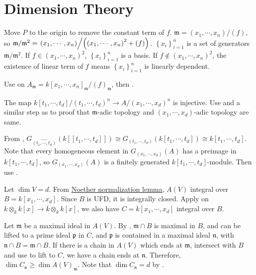 \section{Dimension Theory}

\begin{exercise}\label{ex11.1}
	Move $P$ to the origin to remove the constant term of $f$. $\mathfrak{m}=\left(x_1,\cdots,x_n\right)/(f)$, so $\mathfrak{m}/\mathfrak{m}^2=\left.\left(x_1,\cdots,x_n\right)\middle/\left(\left(x_1,\cdots,x_n\right)^2+(f)\right)\right.$. $\left\{x_i\right\}_{i=1}^n$ is a set of generators $\mathfrak{m}/\mathfrak{m}^2$. If $f\in\left(x_1,\cdots,x_n\right)^2$, $\left\{x_i\right\}_{i=1}^n$ is a basis. If $f\notin\left(x_1,\cdots,x_n\right)^2$, the existence of linear term of $f$ means $\left\{x_i\right\}_{i=1}^n$ is linearly dependent.
	
	Use  on $A_\mathfrak{m}=k\left[x_1,\cdots,x_n\right]_\mathfrak{m}/(f)_\mathfrak{m}$, then .
\end{exercise}

\begin{exercise}\label{ex11.2}
	The map $k[t_1,\cdots,t_d]/\left(t_1,\cdots,t_d\right)^n\rightarrow A/\left(x_1,\cdots,x_d\right)^n$ is injective. Use  and a similar step as  to proof that $\mathfrak{m}$-adic topology and $\left(x_1,\cdots,x_d\right)$-adic topology are same.
	
	From , $G_{\widehat{\left(t_1,\cdots,t_d\right)}}\left(k\left[\left[t_1,\cdots,t_d\right]\right]\right)\cong G_{\left(t_1,\cdots,t_d\right)}\left(k\left[t_1,\cdots,t_d\right]\right)\cong k\left[t_1,\cdots,t_d\right]$. Note that every homogeneous element in $G_{\left(x_1,\cdots,x_d\right)}(A)$ has a preimage in $k\left[t_1,\cdots,t_d\right]$, so $G_{\left(x_1,\cdots,x_d\right)}(A)$ is a finitely generated $k\left[t_1,\cdots,t_d\right]$-module. Then use .
\end{exercise}

\begin{exercise}\label{ex11.3}
	Let $\dim V=d$. From \hyperref[noethernormalization]{Noether normalization lemma}, $A(V)$ integral over $B=k\left[x_1,\cdots,x_d\right]$. Since $B$ is UFD, it is integrally closed. Apply  on $k\otimes_kk[x]\rightarrow\overline{k}\otimes_kk[x]$, we also have $C=\overline{k}\left[x_1,\cdots,x_d\right]$ integral over $B$.
	
	Let $\mathfrak{m}$ be a maximal ideal in $A(V)$. By , $\mathfrak{m}\cap B$ is maximal in $B$, and can be lifted to a prime ideal $\mathfrak{p}$ in $C$, and $\mathfrak{p}$ is contained in a maximal ideal $\mathfrak{n}$, with $\mathfrak{n}\cap B=\mathfrak{m}\cap B$. If there is a chain in $A(V)$ which ends at $\mathfrak{m}$, intersect with $B$ and use  to lift to $C$, we have a chain ends at $\mathfrak{n}$. Therefore, $\dim C_\mathfrak{n}\geqslant\dim A(V)_\mathfrak{m}$. Note that $\dim C_\mathfrak{n}=d$ by .
\end{exercise}

